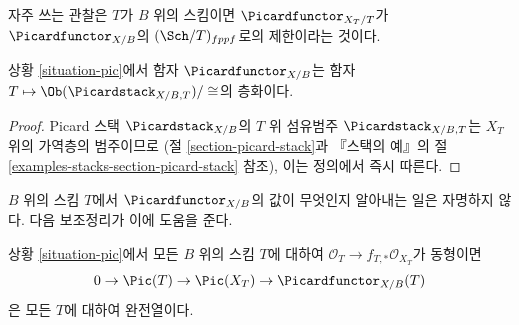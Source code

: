 \medskip\noindent
자주 쓰는 관찰은 $T$가 $B$ 위의 스킴이면 $\Picardfunctor_{X_T/T}$가
$\Picardfunctor_{X/B}$의 $(\Sch/T)_{fppf}$로의 제한이라는 것이다.

\begin{lemma}
\label{lemma-pic-over-pic}
상황 \ref{situation-pic}에서 함자 $\Picardfunctor_{X/B}$는 함자
$T \mapsto \Ob(\Picardstack_{X/B, T})/\cong$의 층화이다.
\end{lemma}

\begin{proof}
Picard 스택 $\Picardstack_{X/B}$의 $T$ 위 섬유범주
$\Picardstack_{X/B, T}$는 $X_T$ 위의 가역층의 범주이므로
(절 \ref{section-picard-stack}과 『스택의 예』의 절
\ref{examples-stacks-section-picard-stack} 참조), 이는 정의에서 즉시 따른다.
\end{proof}

\noindent
$B$ 위의 스킴 $T$에서 $\Picardfunctor_{X/B}$의 값이 무엇인지 알아내는
일은 자명하지 않다. 다음 보조정리가 이에 도움을 준다.

\begin{lemma}
\label{lemma-flat-geometrically-connected-fibres}
상황 \ref{situation-pic}에서 모든 $B$ 위의 스킴 $T$에 대하여
$\mathcal{O}_T \to f_{T, *}\mathcal{O}_{X_T}$가 동형이면
$$
0 \to \Pic(T) \to \Pic(X_T) \to \Picardfunctor_{X/B}(T)
$$
은 모든 $T$에 대하여 완전열이다.
\end{lemma}

